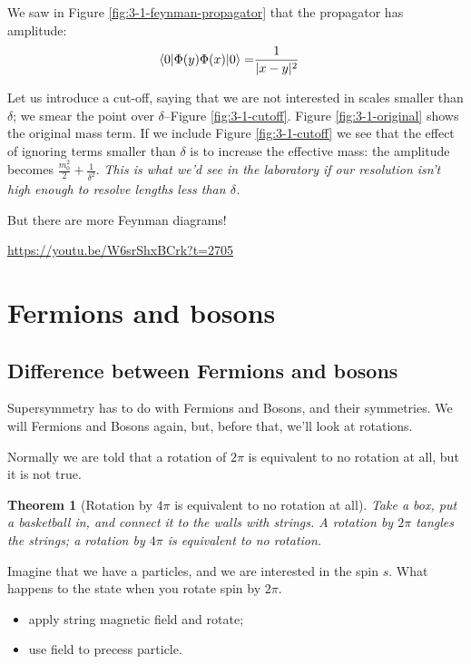 \documentclass[]{article}
\newtheorem{thm}{Theorem}
\begin{document}
We saw in Figure \ref{fig:3-1-feynman-propagator} that the propagator has amplitude:
\begin{align*}
	\braket{0|\Phi(y)\Phi(x)|0}=&\frac{1}{|x-y|^2}
\end{align*}

Let us introduce a cut-off, saying that we are not interested in scales smaller than $\delta$; we smear the point over $\delta$--Figure \ref{fig:3-1-cutoff}. Figure \ref{fig:3-1-original} shows the original mass term. If we include Figure \ref{fig:3-1-cutoff} we see that the effect of ignoring terms smaller than $\delta$ is to increase the effective mass: the amplitude becomes $\frac{m_0^2}{2}+\frac{1}{\delta^2}$.  \emph{This is what we'd see in the laboratory if our resolution isn't high enough to resolve lengths less than $\delta$.}  

But there are more Feynman diagrams!

\url{https://youtu.be/W6srShxBCrk?t=2705}
	
\section{Fermions and bosons}

\subsection{Difference between Fermions and bosons}
Supersymmetry has to do with Fermions and Bosons, and their symmetries. We will Fermions and Bosons again, but, before that, we'll look at rotations.

Normally we are told that a rotation of $2\pi$ is equivalent to no rotation at all, but it is not true.

\begin{thm}[Rotation by $4\pi$ is equivalent to no rotation at all]
	Take a box, put a basketball in, and connect it to the walls with strings. A rotation by $2\pi$ tangles the strings; a rotation by $4\pi$ is equivalent to no rotation.
\end{thm}

Imagine that we have a particles, and we are interested in the spin $s$. What happens to the state when you rotate spin by $2\pi$.
\begin{itemize}
	\item apply string magnetic field and rotate;
	\item use field to precess particle.
\end{itemize}
\end{document}
